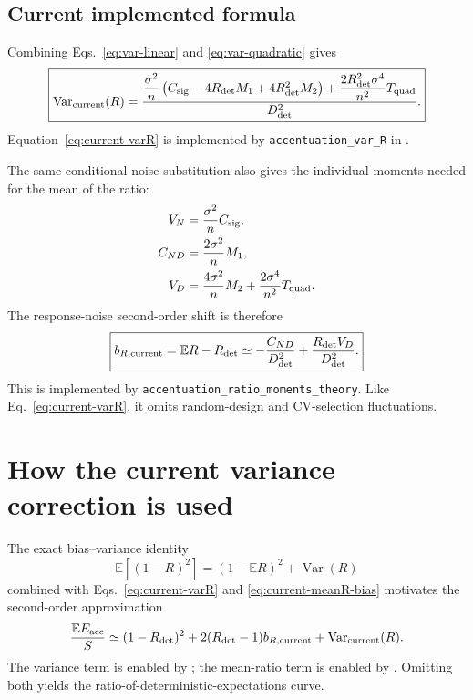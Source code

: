 \documentclass[11pt]{article}
\newcommand{\E}{\mathbb{E}}
\newcommand{\Var}{\operatorname{Var}}
\begin{document}
\subsection{Current implemented formula}

Combining Eqs.~\eqref{eq:var-linear} and \eqref{eq:var-quadratic} gives
\begin{equation}
\boxed{
  \Var_{\rm current}(R)
  =
  \frac{
    \dfrac{\sigma^2}{n}
    \left(
      C_{\rm sig}
      -4R_{\rm det}M_1
      +4R_{\rm det}^2M_2
    \right)
    +
    \dfrac{2R_{\rm det}^2\sigma^4}{n^2}
    T_{\rm quad}
  }{D_{\rm det}^2}.
}
\label{eq:current-varR}
\end{equation}
Equation~\eqref{eq:current-varR} is implemented by
\texttt{accentuation\_var\_R} in
.

The same conditional-noise substitution also gives the individual moments
needed for the mean of the ratio:
\begin{align}
  V_N&=\frac{\sigma^2}{n}C_{\rm sig},\\
  C_{ND}&=\frac{2\sigma^2}{n}M_1,\\
  V_D&=\frac{4\sigma^2}{n}M_2
      +\frac{2\sigma^4}{n^2}T_{\rm quad}.
\end{align}
The response-noise second-order shift is therefore
\begin{equation}
\boxed{
  b_{R,{\rm current}}
  =\E R-R_{\rm det}
  \simeq
  -\frac{C_{ND}}{D_{\rm det}^2}
  +\frac{R_{\rm det}V_D}{D_{\rm det}^2}.
}
\label{eq:current-meanR-bias}
\end{equation}
This is implemented by
\texttt{accentuation\_ratio\_moments\_theory}.  Like
Eq.~\eqref{eq:current-varR}, it omits random-design and CV-selection
fluctuations.

\section{How the current variance correction is used}

The exact bias--variance identity
\begin{equation}
  \E[(1-R)^2]
  =(1-\E R)^2+\Var(R)
\end{equation}
combined with Eqs.~\eqref{eq:current-varR} and
\eqref{eq:current-meanR-bias} motivates the second-order approximation
\begin{equation}
  \frac{\E E_{\rm acc}}{S}
  \simeq
  (1-R_{\rm det})^2
  +2(R_{\rm det}-1)b_{R,{\rm current}}
  +\Var_{\rm current}(R).
  \label{eq:Eacc-correction}
\end{equation}
The variance term is enabled by ; the mean-ratio
term is enabled by .  Omitting both yields the
ratio-of-deterministic-expectations curve.
\end{document}
